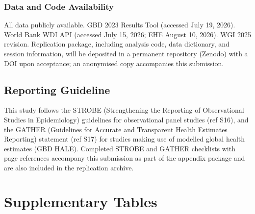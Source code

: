 \documentclass[10pt,a4paper]{article}
\begin{document}
\subsubsection{Data and Code Availability}
All data publicly available. GBD 2023 Results Tool (accessed July 19, 2026). World Bank WDI API (accessed July 15, 2026; EHE August 10, 2026). WGI 2025 revision. Replication package, including analysis code, data dictionary, and session information, will be deposited in a permanent repository (Zenodo) with a DOI upon acceptance; an anonymised copy accompanies this submission.

\subsection{Reporting Guideline}
This study follows the STROBE (Strengthening the Reporting of Observational Studies in Epidemiology) guidelines for observational panel studies (ref S16), and the GATHER (Guidelines for Accurate and Transparent Health Estimates Reporting) statement (ref S17) for studies making use of modelled global health estimates (GBD HALE). Completed STROBE and GATHER checklists with page references accompany this submission as part of the appendix package and are also included in the replication archive.

\section{Supplementary Tables}
\end{document}
